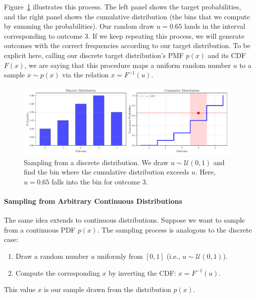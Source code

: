 Figure~\ref{fig:discrete-sampling-mc} illustrates this process. The left panel shows the target probabilities, and the right panel shows the cumulative distribution (the bins that we compute by summing the probabilities). Our random draw $u = 0.65$ lands in the interval corresponding to outcome 3. If we keep repeating this process, we will generate outcomes with the correct frequencies according to our target distribution. To be explicit here, calling our discrete target distribution's PMF $p(x)$ and its CDF $F(x)$, we are saying that this procedure maps a uniform random number $u$ to a sample $x \sim p(x)$ via the relation $x = F^{-1}(u)$.

\begin{figure}[htbp]
    \centering
    \includegraphics[width=0.98\textwidth]{./figs/monte-carlo/discrete_sampling.pdf}
    \caption{Sampling from a discrete distribution. We draw $u \sim \mathcal{U}(0,1)$ and find the bin where the cumulative distribution exceeds $u$. Here, $u=0.65$ falls into the bin for outcome 3.}
    \label{fig:discrete-sampling-mc}
\end{figure}

\paragraph*{Sampling from Arbitrary Continuous Distributions}
The same idea extends to continuous distributions. Suppose we want to sample from a continuous PDF $p(x)$. The sampling process is analogous to the discrete case:
\begin{enumerate}
    \item Draw a random number $u$ uniformly from $[0,1]$ (i.e., $u \sim \mathcal{U}(0,1)$).
    \item Compute the corresponding $x$ by inverting the CDF: $x = F^{-1}(u)$.
\end{enumerate}
This value $x$ is our sample drawn from the distribution $p(x)$.

